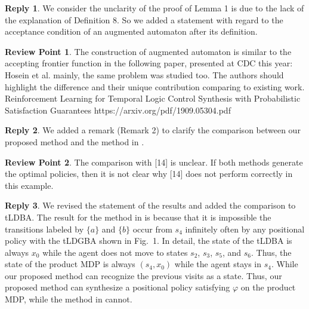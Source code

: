 \documentclass[10 pt, dvipdfmx]{article}
\theoremstyle{definition}
\newtheorem{review point}{Review Point}[section]
\newtheorem*{reply}{Reply}
\begin{document}
\begin{reply}
  We consider the unclarity of the proof of Lemma 1 is due to the lack of the explanation of Definition 8. So we added a statement with regard to the acceptance condition of an augmented automaton after its definition.
\end{reply}

\begin{review point}
  The construction of augmented automaton is similar to the accepting
frontier function in the following paper, presented at CDC this year: Hosein et
al.  mainly, the same problem was studied too. The authors should
highlight the difference and their unique contribution comparing to
existing work.
Reinforcement Learning for Temporal Logic Control Synthesis with
Probabilistic Satisfaction Guarantees
https://arxiv.org/pdf/1909.05304.pdf
\end{review point}

\begin{reply}
  We added a remark (Remark 2) to clarify the comparison between our proposed method and the method in \cite{HAK2019,HKAKPL2019}.
\end{reply}

\begin{review point}
  The comparison with [14] is unclear. If both methods generate the
optimal policies, then it is not clear why [14] does not perform
correctly in this example.
\end{review point}

\begin{reply}
  We revised the statement of the results and added the comparison to tLDBA. The result for the method in \cite{HAK2019, HKAKPL2019} is because that it is impossible the transitions labeled by $\{ a \}$ and $\{ b \}$ occur from $s_4$ infinitely often by any positional policy with the tLDGBA shown in Fig.\ 1. In detail, the state of the tLDBA is always $x_0$ while the agent does not move to states $s_2$, $s_3$, $s_5$, and $s_6$. Thus, the state of the product MDP is always $(s_4, x_0)$ while the agent stays in $s_4$. While our proposed method can recognize the previous visits as a state. Thus, our proposed method can synthesize a positional policy satisfying $\varphi$ on the product MDP, while the method in \cite{HAK2019, HKAKPL2019} cannot. %
\end{reply}
\end{document}
